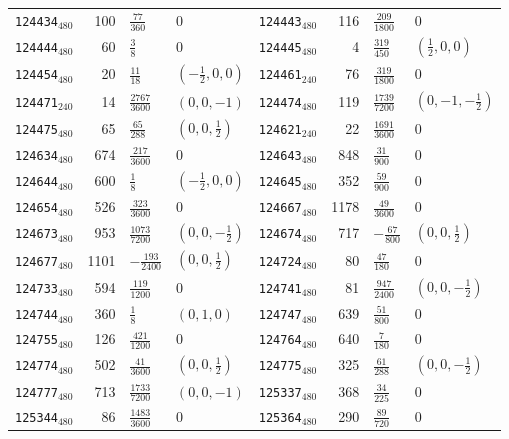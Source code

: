 {\begin{longtable}{@{}lrll@{\hspace{2em}}lrll@{}}
\texttt{124434}$_{480}$ & 100 & $\tfrac{77}{360}$ & 0 & \texttt{124443}$_{480}$ & 116 & $\tfrac{209}{1800}$ & 0\\
\texttt{124444}$_{480}$ & 60 & $\tfrac{3}{8}$ & 0 & \texttt{124445}$_{480}$ & 4 & $\tfrac{319}{450}$ & $(\tfrac{1}{2},0,0)$\\
\texttt{124454}$_{480}$ & 20 & $\tfrac{11}{18}$ & $(-\tfrac{1}{2},0,0)$ & \texttt{124461}$_{240}$ & 76 & $\tfrac{319}{1800}$ & 0\\
\texttt{124471}$_{240}$ & 14 & $\tfrac{2767}{3600}$ & $(0,0,-1)$ & \texttt{124474}$_{480}$ & 119 & $\tfrac{1739}{7200}$ & $(0,-1,-\tfrac{1}{2})$\\
\texttt{124475}$_{480}$ & 65 & $\tfrac{65}{288}$ & $(0,0,\tfrac{1}{2})$ & \texttt{124621}$_{240}$ & 22 & $\tfrac{1691}{3600}$ & 0\\
\texttt{124634}$_{480}$ & 674 & $\tfrac{217}{3600}$ & 0 & \texttt{124643}$_{480}$ & 848 & $\tfrac{31}{900}$ & 0\\
\texttt{124644}$_{480}$ & 600 & $\tfrac{1}{8}$ & $(-\tfrac{1}{2},0,0)$ & \texttt{124645}$_{480}$ & 352 & $\tfrac{59}{900}$ & 0\\
\texttt{124654}$_{480}$ & 526 & $\tfrac{323}{3600}$ & 0 & \texttt{124667}$_{480}$ & 1178 & $\tfrac{49}{3600}$ & 0\\
\texttt{124673}$_{480}$ & 953 & $\tfrac{1073}{7200}$ & $(0,0,-\tfrac{1}{2})$ & \texttt{124674}$_{480}$ & 717 & $-\tfrac{67}{800}$ & $(0,0,\tfrac{1}{2})$\\
\texttt{124677}$_{480}$ & 1101 & $-\tfrac{193}{2400}$ & $(0,0,\tfrac{1}{2})$ & \texttt{124724}$_{480}$ & 80 & $\tfrac{47}{180}$ & 0\\
\texttt{124733}$_{480}$ & 594 & $\tfrac{119}{1200}$ & 0 & \texttt{124741}$_{480}$ & 81 & $\tfrac{947}{2400}$ & $(0,0,-\tfrac{1}{2})$\\
\texttt{124744}$_{480}$ & 360 & $\tfrac{1}{8}$ & $(0,1,0)$ & \texttt{124747}$_{480}$ & 639 & $\tfrac{51}{800}$ & 0\\
\texttt{124755}$_{480}$ & 126 & $\tfrac{421}{1200}$ & 0 & \texttt{124764}$_{480}$ & 640 & $\tfrac{7}{180}$ & 0\\
\texttt{124774}$_{480}$ & 502 & $\tfrac{41}{3600}$ & $(0,0,\tfrac{1}{2})$ & \texttt{124775}$_{480}$ & 325 & $\tfrac{61}{288}$ & $(0,0,-\tfrac{1}{2})$\\
\texttt{124777}$_{480}$ & 713 & $\tfrac{1733}{7200}$ & $(0,0,-1)$ & \texttt{125337}$_{480}$ & 368 & $\tfrac{34}{225}$ & 0\\
\texttt{125344}$_{480}$ & 86 & $\tfrac{1483}{3600}$ & 0 & \texttt{125364}$_{480}$ & 290 & $\tfrac{89}{720}$ & 0\\

\end{longtable}}
